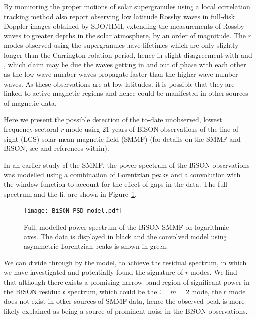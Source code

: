 By monitoring the proper motions of solar supergranules using a local correlation tracking method \citet{hathaway_hydrodynamic_2020} also report observing low latitude Rossby waves in full-disk Doppler images obtained by SDO/HMI, extending the measurements of Rossby waves to greater depths in the solar atmosphere, by an order of magnitude. The $r$ modes observed using the supergranules have lifetimes which are only slightly longer than the Carrington rotation period, hence in slight disagreement with \citet{loptien_global-scale_2018} and \citet{liang_time-distance_2019}, which \citet{hathaway_hydrodynamic_2020} claim may be due the waves getting in and out of phase with each other as the low wave number waves propagate faster than the higher wave number waves. As these observations are at low latitudes, it is possible that they are linked to active magnetic regions and hence could be manifested in other sources of magnetic data.

Here we present the possible detection of the to-date unobserved, lowest frequency sectoral $r$ mode using 21 years of BiSON observations of the line of sight (LOS) solar mean magnetic field (SMMF) (for details on the SMMF and BiSON, see \citet{chaplin_studies_2003} and references within).

In an earlier study of the SMMF, the power spectrum of the BiSON observations was modelled using a combination of Lorentzian peaks and a convolution with the window function to account for the effect of gaps in the data. The full spectrum and the fit are shown in Figure~\ref{fig:BiSON_PSD}.



\begin{figure}[ht!]
	\centering
	\texttt{[image: BiSON\_PSD\_model.pdf]}
	\caption{Full, modelled power spectrum of the BiSON SMMF on logarithmic axes. The data is displayed in black and the convolved model using asymmetric Lorentzian peaks is shown in green.}
	\label{fig:BiSON_PSD}
\end{figure}

We can divide through by the model, to achieve the residual spectrum, in which we have investigated and potentially found the signature of $r$ modes. We find that although there exists a promising narrow-band region of significant power in the BiSON residuals spectrum, which could be the $l=m=2$ mode, the $r$ mode does not exist in other sources of SMMF data, hence the observed peak is more likely explained as being a source of prominent noise in the BiSON observations.




